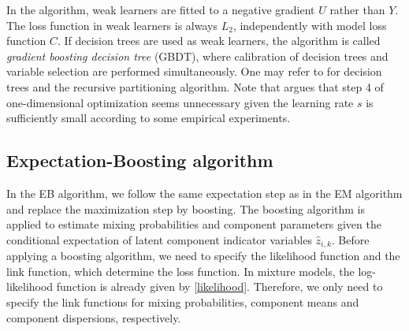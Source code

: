 \documentclass[11pt]{article}
\numberwithin{equation}{section}
\begin{document}
In the algorithm, weak learners are fitted to a negative gradient $U$ rather than $Y$.
		 The loss function in weak learners is always $L_2$, independently with model loss function $C$. 
		 If decision trees \citep{breiman1983classification} are used as weak learners, the algorithm is called \textit{gradient boosting decision tree} (GBDT), where {calibration of decision trees and variable selection} are performed simultaneously.
		 One may refer to \citet{hastie2009elements} for decision trees and the recursive partitioning algorithm. Note that
		\citet{buhlmann2007boosting} argues that step 4 of one-dimensional optimization seems unnecessary given the learning rate $s$ is sufficiently small according to some empirical experiments.




\subsection{Expectation-Boosting algorithm}

In the EB algorithm, we follow the same expectation step as in the EM algorithm and replace the maximization step by boosting.
The boosting algorithm is applied to estimate mixing probabilities and component parameters given the conditional expectation of latent component indicator variables $\hat{z}_{i,k}$.
Before applying a boosting algorithm, we need to specify the likelihood function and the link function, which determine the loss function.
In mixture models, the log-likelihood function is already given by \eqref{likelihood}.
Therefore, we only need to specify the link functions for mixing probabilities, component means and component dispersions, respectively.
\end{document}
